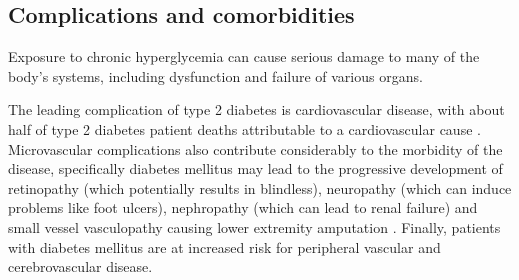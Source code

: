 \subsection{Complications and comorbidities}
Exposure to chronic hyperglycemia can cause serious damage to many of the body's systems, including dysfunction and failure of various organs.

The leading complication of type 2 diabetes is cardiovascular disease, with about half of type 2 diabetes patient deaths attributable to a cardiovascular cause \citep{doi:10.1001/jama.2009.476, beulens2010global}. Microvascular complications also contribute considerably to the morbidity of the disease, specifically diabetes mellitus may lead to the progressive development of retinopathy (which potentially results in blindless), neuropathy (which can induce problems like foot ulcers), nephropathy (which can lead to renal failure) \citep{atkins2010diabetic} and small vessel vasculopathy causing lower extremity amputation \citep{beulens2010global}. Finally, patients with diabetes mellitus are at increased risk for peripheral vascular and cerebrovascular disease. 




